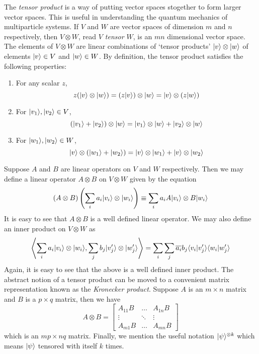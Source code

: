 The \textit{tensor product} is a way of putting vector spaces stogether to form larger vector spaces. This is useful in understanding the quantum mechanics of multiparticle systems. If $V$ and $W$ are vector spaces of dimension $m$ and $n$ respectively, then $V\otimes W$, read \textit{$V$ tensor $W$}, is an $mn$ dimensional vector space. The elements of $V\otimes W$ are linear combinations of `tensor products' $|v\rangle\otimes|w\rangle$ of elements $|v\rangle\in V$ and $|w\rangle\in W$. By definition, the tensor product satisfies the following properties:
\begin{enumerate}
    \item For any scalar $z$, 
    \begin{equation*}
        z(|v\rangle\otimes|w\rangle) = (z|v\rangle)\otimes|w\rangle = |v\rangle\otimes(z|w\rangle)
    \end{equation*}
    \item For $|v_1\rangle,|v_2\rangle\in V$,
    \begin{equation*}
        (|v_1\rangle + |v_2\rangle)\otimes|w\rangle = |v_1\rangle\otimes|w\rangle + |v_2\rangle\otimes|w\rangle
    \end{equation*}
    \item For $|w_1\rangle,|w_2\rangle\in W$, 
    \begin{equation*}
        |v\rangle\otimes(|w_1\rangle + |w_2\rangle) = |v\rangle\otimes|w_1\rangle + |v\rangle\otimes|w_2\rangle
    \end{equation*}
\end{enumerate}

Suppose $A$ and $B$ are linear operators on $V$ and $W$ respectively. Then we may define a linear operator $A\otimes B$ on $V\otimes W$ given by the equation
\begin{equation*}
    (A\otimes B)\left(\sum_ia_i|v_i\rangle\otimes|w_i\rangle\right) \equiv\sum_ia_iA|v_i\rangle\otimes B|w_i\rangle
\end{equation*}
It is easy to see that $A\otimes B$ is a well defined linear operator. We may also define an inner product on $V\otimes W$ as 
\begin{equation*}
    \left\langle\sum_ia_i|v_i\rangle\otimes|w_i\rangle,\sum_jb_j|v_j'\rangle\otimes|w_j'\rangle\right\rangle = \sum_i\sum_j\overline{a_i}b_j\langle v_i|v_j'\rangle\langle w_i|w_j'\rangle
\end{equation*}
Again, it is easy to see that the above is a well defined inner product. The abstract notion of a tensor product can be moved to a convenient matrix representation known as the \textit{Kronecker product}. Suppose $A$ is an $m\times n$ matrix and $B$ is a $p\times q$ matrix, then we have 
\begin{equation*}
    A\otimes B = 
    \begin{bmatrix}
        A_{11}B & \ldots & A_{1n}B\\
        \vdots & \ddots & \vdots\\
        A_{m1}B & \ldots & A_{mn}B
    \end{bmatrix}
\end{equation*}
which is an $mp\times nq$ matrix. Finally, we mention the useful notation $|\psi\rangle^{\otimes k}$ which means $|\psi\rangle$ tensored with itself $k$ times.

